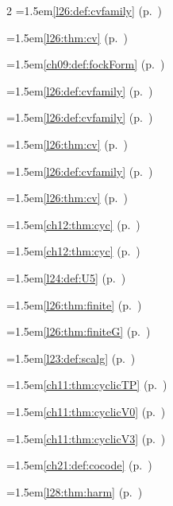 \begin{multicols}{2}
\hangindent=1.5em\quad \ref{l26:def:cvfamily} (p.~\pageref{l26:def:cvfamily})\par
\hangindent=1.5em\quad \ref{l26:thm:cv} (p.~\pageref{l26:thm:cv})\par
\hangindent=1.5em\quad \ref{ch09:def:fockForm} (p.~\pageref{ch09:def:fockForm})\par
\hangindent=1.5em\quad \ref{l26:def:cvfamily} (p.~\pageref{l26:def:cvfamily})\par
\hangindent=1.5em\quad \ref{l26:def:cvfamily} (p.~\pageref{l26:def:cvfamily})\par
\hangindent=1.5em\quad \ref{l26:thm:cv} (p.~\pageref{l26:thm:cv})\par
\hangindent=1.5em\quad \ref{l26:def:cvfamily} (p.~\pageref{l26:def:cvfamily})\par
\hangindent=1.5em\quad \ref{l26:thm:cv} (p.~\pageref{l26:thm:cv})\par
\hangindent=1.5em\quad \ref{ch12:thm:cyc} (p.~\pageref{ch12:thm:cyc})\par
\hangindent=1.5em\quad \ref{ch12:thm:cyc} (p.~\pageref{ch12:thm:cyc})\par
\hangindent=1.5em\quad \ref{l24:def:U5} (p.~\pageref{l24:def:U5})\par
\hangindent=1.5em\quad \ref{l26:thm:finite} (p.~\pageref{l26:thm:finite})\par
\hangindent=1.5em\quad \ref{l26:thm:finiteG} (p.~\pageref{l26:thm:finiteG})\par
\hangindent=1.5em\quad \ref{l23:def:scalg} (p.~\pageref{l23:def:scalg})\par
\hangindent=1.5em\quad \ref{ch11:thm:cyclicTP} (p.~\pageref{ch11:thm:cyclicTP})\par
\hangindent=1.5em\quad \ref{ch11:thm:cyclicV0} (p.~\pageref{ch11:thm:cyclicV0})\par
\hangindent=1.5em\quad \ref{ch11:thm:cyclicV3} (p.~\pageref{ch11:thm:cyclicV3})\par
\hangindent=1.5em\quad \ref{ch21:def:cocode} (p.~\pageref{ch21:def:cocode})\par
\par{}\par\nopagebreak\smallskip
\hangindent=1.5em\quad \ref{l28:thm:harm} (p.~\pageref{l28:thm:harm})\par

\end{multicols}
